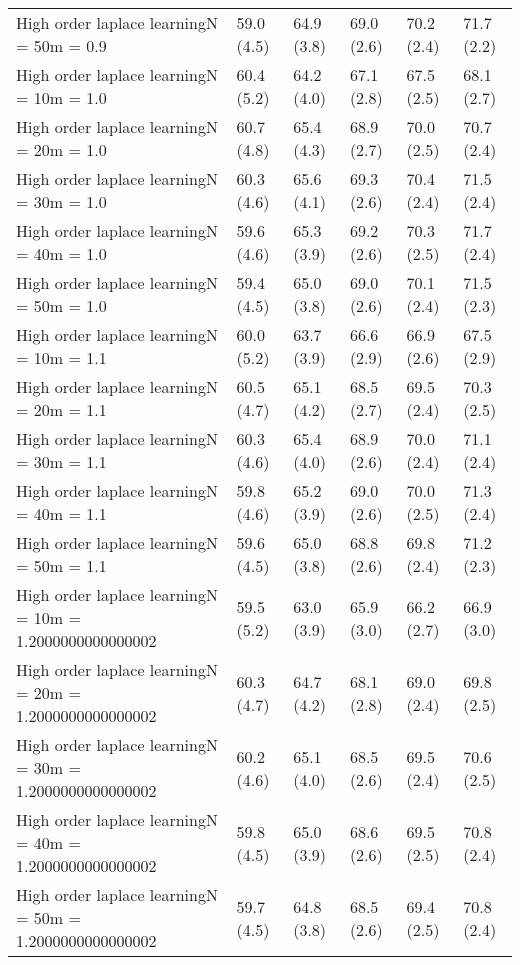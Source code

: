 \documentclass{article}
\begin{document}
\begin{table*}[t!]
\begin{center}
\begin{small}
\begin{sc}
\begin{tabular}{llllll}
High order laplace learningN = 50m = 0.9&59.0 (4.5)      &64.9 (3.8)      &69.0 (2.6)      &70.2 (2.4)      &71.7 (2.2)      \\
High order laplace learningN = 10m = 1.0&60.4 (5.2)      &64.2 (4.0)      &67.1 (2.8)      &67.5 (2.5)      &68.1 (2.7)      \\
High order laplace learningN = 20m = 1.0&60.7 (4.8)      &65.4 (4.3)      &68.9 (2.7)      &70.0 (2.5)      &70.7 (2.4)      \\
High order laplace learningN = 30m = 1.0&60.3 (4.6)      &65.6 (4.1)      &69.3 (2.6)      &70.4 (2.4)      &71.5 (2.4)      \\
High order laplace learningN = 40m = 1.0&59.6 (4.6)      &65.3 (3.9)      &69.2 (2.6)      &70.3 (2.5)      &71.7 (2.4)      \\
High order laplace learningN = 50m = 1.0&59.4 (4.5)      &65.0 (3.8)      &69.0 (2.6)      &70.1 (2.4)      &71.5 (2.3)      \\
High order laplace learningN = 10m = 1.1&60.0 (5.2)      &63.7 (3.9)      &66.6 (2.9)      &66.9 (2.6)      &67.5 (2.9)      \\
High order laplace learningN = 20m = 1.1&60.5 (4.7)      &65.1 (4.2)      &68.5 (2.7)      &69.5 (2.4)      &70.3 (2.5)      \\
High order laplace learningN = 30m = 1.1&60.3 (4.6)      &65.4 (4.0)      &68.9 (2.6)      &70.0 (2.4)      &71.1 (2.4)      \\
High order laplace learningN = 40m = 1.1&59.8 (4.6)      &65.2 (3.9)      &69.0 (2.6)      &70.0 (2.5)      &71.3 (2.4)      \\
High order laplace learningN = 50m = 1.1&59.6 (4.5)      &65.0 (3.8)      &68.8 (2.6)      &69.8 (2.4)      &71.2 (2.3)      \\
High order laplace learningN = 10m = 1.2000000000000002&59.5 (5.2)      &63.0 (3.9)      &65.9 (3.0)      &66.2 (2.7)      &66.9 (3.0)      \\
High order laplace learningN = 20m = 1.2000000000000002&60.3 (4.7)      &64.7 (4.2)      &68.1 (2.8)      &69.0 (2.4)      &69.8 (2.5)      \\
High order laplace learningN = 30m = 1.2000000000000002&60.2 (4.6)      &65.1 (4.0)      &68.5 (2.6)      &69.5 (2.4)      &70.6 (2.5)      \\
High order laplace learningN = 40m = 1.2000000000000002&59.8 (4.5)      &65.0 (3.9)      &68.6 (2.6)      &69.5 (2.5)      &70.8 (2.4)      \\
High order laplace learningN = 50m = 1.2000000000000002&59.7 (4.5)      &64.8 (3.8)      &68.5 (2.6)      &69.4 (2.5)      &70.8 (2.4)      \\

\end{tabular}
\end{sc}
\end{small}
\end{center}
\end{table*}
\end{document}
